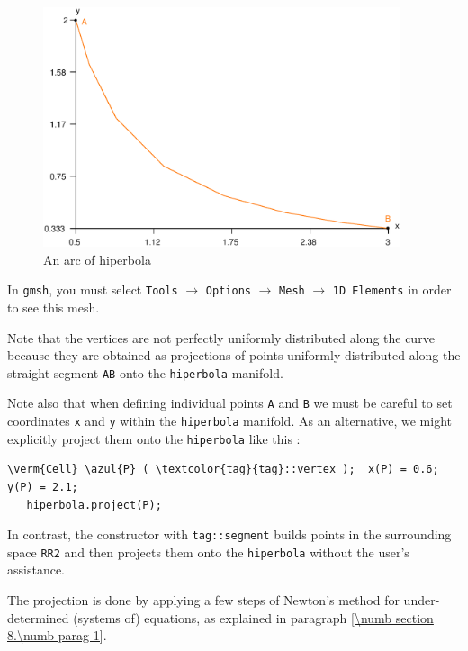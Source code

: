 \begin{figure}[ht] \centering
  \includegraphics[width=105mm]{hiperbola}
  \caption{An arc of hiperbola}
  \label{\numb section 2.\numb fig 4}
\end{figure}

In {\tt gmsh}, you must select {\small\tt Tools} $\to$ {\small\tt Options} $\to$
{\small\tt Mesh} $\to$ {\small\tt 1D Elements} in order to see this mesh.

Note that the vertices are not perfectly uniformly distributed along the curve
because they are obtained as projections of points uniformly distributed along
the straight segment {\small\tt AB} onto the {\small\tt hiperbola} manifold.

Note also that when defining individual points {\small\tt A} and {\small\tt B} we must
be careful to set coordinates {\small\tt x} and {\small\tt y} within
the {\small\tt hiperbola} manifold.
As an alternative, we might explicitly project them onto the {\small\tt hiperbola} like this :

\begin{Verbatim}[commandchars=\\\{\},formatcom=\small\tt,baselinestretch=0.94]
   \verm{Cell} \azul{P} ( \textcolor{tag}{tag}::vertex );  x(P) = 0.6;   y(P) = 2.1;
   hiperbola.project(P);
\end{Verbatim}

\noindent In contrast, the {\small\tt {}} constructor with {\small\tt \textcolor{tag}{tag}::segment}
builds points in the surrounding space {\small\tt RR2} and then projects them onto the
{\small\tt hiperbola} without the user's assistance.

The projection is done by applying a few steps of Newton's method for under-determined
(systems of) equations, as explained in paragraph \ref{\numb section 8.\numb parag 1}.

